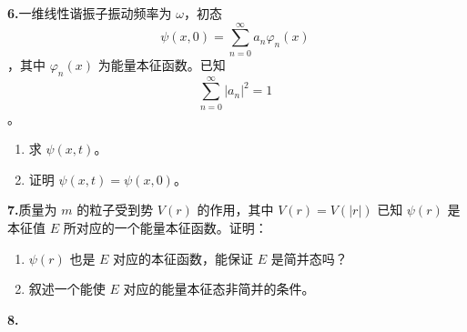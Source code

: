 \textbf{6.}一维线性谐振子振动频率为 $\omega$，初态 $$\psi(x, 0) = \sum_{n=0}^{\infty} a_n \varphi_n(x)~$$，其中 $\varphi_n(x)$ 为能量本征函数。已知 $$\sum_{n=0}^{\infty} |a_n|^2 = 1~$$。
\begin{enumerate}
    \item 求 $\psi(x, t)$。
    \item 证明 $\psi(x, t) = \psi(x, 0) $。
\end{enumerate}

\textbf{7.}质量为 $m$ 的粒子受到势 $V(r)$ 的作用，其中 $V(r) = V(|r|)$ 已知 $\psi(r)$ 是本征值 $E$ 所对应的一个能量本征函数。证明：
\begin{enumerate}
    \item  $\psi(r)$ 也是 $E$ 对应的本征函数，能保证 $E$ 是简并态吗？
    \item  叙述一个能使 $E$ 对应的能量本征态非简并的条件。
\end{enumerate}

\textbf{8.}